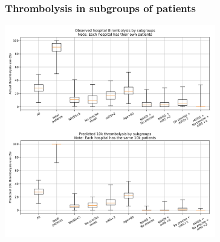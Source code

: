 \documentclass{beamer}
\begin{document}

\begin{frame}
\frametitle{Thrombolysis in subgroups of patients}

\begin{center}
\includegraphics[width=0.69\textwidth]{./images/15a_actual_vs_modelled_subgroup_violin.jpg}
\end{center}
\end{frame}

\end{document}
